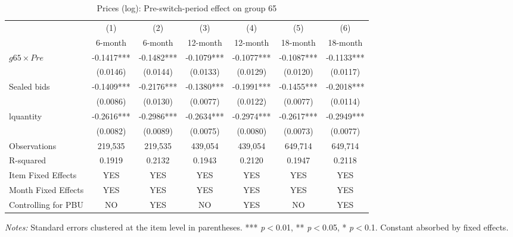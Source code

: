 \begin{table}[htbp]
\centering
\caption{Prices (log): Pre-switch-period effect on group 65}
\label{tab:prices}
\begin{adjustbox}{max width=\textwidth}
\begin{threeparttable}
\small
\begin{tabular}{lcccccc}
\toprule
 & (1) & (2) & (3) & (4) & (5) & (6) \\
 & 6-month & 6-month & 12-month & 12-month & 18-month & 18-month \\
\midrule
$g65 \times Pre$ & -0.1417*** & -0.1482*** & -0.1079*** & -0.1077*** & -0.1087*** & -0.1133*** \\
 & (0.0146) & (0.0144) & (0.0133) & (0.0129) & (0.0120) & (0.0117) \\
Sealed bids & -0.1409*** & -0.2176*** & -0.1380*** & -0.1991*** & -0.1455*** & -0.2018*** \\
 & (0.0086) & (0.0130) & (0.0077) & (0.0122) & (0.0077) & (0.0114) \\
lquantity & -0.2616*** & -0.2986*** & -0.2634*** & -0.2974*** & -0.2617*** & -0.2949*** \\
 & (0.0082) & (0.0089) & (0.0075) & (0.0080) & (0.0073) & (0.0077) \\
\midrule
Observations & 219,535 & 219,535 & 439,054 & 439,054 & 649,714 & 649,714 \\
R-squared & 0.1919 & 0.2132 & 0.1943 & 0.2120 & 0.1947 & 0.2118 \\
Item Fixed Effects & YES & YES & YES & YES & YES & YES \\
Month Fixed Effects & YES & YES & YES & YES & YES & YES \\
Controlling for PBU & NO & YES & NO & YES & NO & YES \\
\bottomrule
\end{tabular}
\begin{tablenotes}
\small
\item \textit{Notes:} Standard errors clustered at the item level in parentheses.
*** \textit{p}$<$0.01, ** \textit{p}$<$0.05, * \textit{p}$<$0.1.
Constant absorbed by fixed effects.
\end{tablenotes}
\end{threeparttable}
\end{adjustbox}
\end{table}

